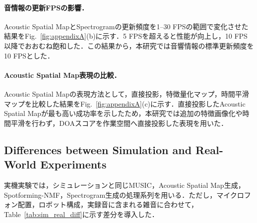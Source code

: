 \documentclass{article}
\begin{document}
\paragraph{音情報の更新FPSの影響．}
Acoustic Spatial MapとSpectrogramの更新頻度を1--30 FPSの範囲で変化させた結果をFig.~\ref{fig:appendixA}(b)に示す．5 FPSを超えると性能が向上し，10 FPS以降でおおむね飽和した．この結果から，本研究では音響情報の標準更新頻度を10 FPSとした．

\paragraph{Acoustic Spatial Map表現の比較．}
Acoustic Spatial Mapの表現方法として，直接投影，特徴量化マップ，時間平滑マップを比較した結果をFig.~\ref{fig:appendixA}(c)に示す．直接投影したAcoustic Spatial Mapが最も高い成功率を示したため，本研究では追加の特徴画像化や時間平滑を行わず，DOAスコアを作業空間へ直接投影した表現を用いた．





\subsection{Differences between Simulation and Real-World Experiments}
\label{sec:appendix_sim_real}
実機実験では，シミュレーションと同じMUSIC，Acoustic Spatial Map生成，Spotforming-NMF，Spectrogram生成の処理系列を用いる．ただし，マイクロフォン配置，ロボット構成，実録音に含まれる雑音に合わせて，Table~\ref{tab:sim_real_diff}に示す差分を導入した．
\end{document}
